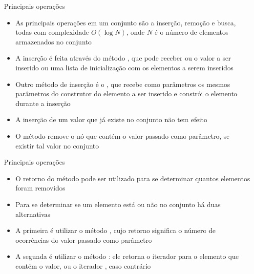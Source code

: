 \begin{frame}[fragile]{Principais operações}

    \begin{itemize}
        \item As principais operações em um conjunto são a inserção, remoção e busca,
        todas com complexidade $O(\log N)$, onde $N$ é o número de elementos armazenados
        no conjunto

        \item A inserção é feita através do método , que pode receber ou o
            valor a ser inserido ou uma lista de inicialização com os elementos a serem
            inseridos

        \item Outro método de inserção é o , que recebe como parâmetros os mesmos
            parâmetros do construtor do elemento a ser inserido e constrói o elemento durante a inserção

        \item A inserção de um valor que já existe no conjunto não tem efeito

        \item O método  remove o nó que contém o valor passado como parâmetro,
            se existir tal valor no conjunto
    \end{itemize}

\end{frame}

\begin{frame}[fragile]{Principais operações}

    \begin{itemize}
        \item O retorno do método pode ser utilizado para se determinar quantos elementos foram
            removidos

        \item Para se determinar se um elemento está ou não no conjunto há duas alternativas

        \item A primeira é utilizar o método , cujo retorno significa o número
            de ocorrências do valor passado como parâmetro

        \item A segunda é utilizar o método : ele retorna o iterador para o
            elemento que contém o valor, ou o iterador , caso contrário
    \end{itemize}

\end{frame}

